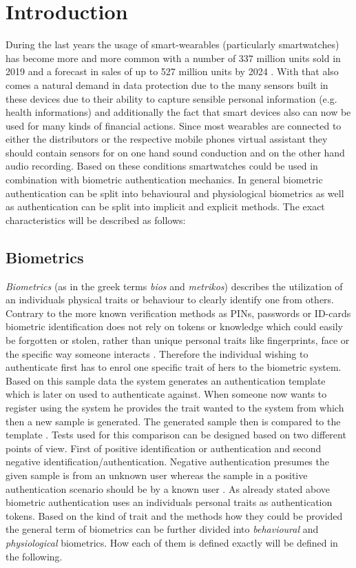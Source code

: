 \section{Introduction}
During the last years the usage of smart-wearables (particularly smartwatches) has become more and more common with a number of 337 million units sold in 2019 and a forecast in sales of up to 527 million units by 2024 \cite{tenzer}.
With that also comes a natural demand in data protection due to the many sensors built in these devices due to their ability to capture sensible personal information (e.g. health informations) and additionally the fact that smart devices also can now be used for many kinds of financial actions.\newline
Since most wearables are connected to either the distributors or the respective mobile phones virtual assistant they should contain sensors for on one hand sound conduction and on the other hand audio recording.\newline
Based on these conditions smartwatches could be used in combination with biometric authentication mechanics.\newline
In general biometric authentication can be split into behavioural and physiological biometrics as well as authentication can be split into implicit and explicit methods. The exact characteristics will be described as follows: 
\subsection{Biometrics}
\textit{Biometrics} (as in the greek terms \textit{bios} and \textit{metrikos}) describes the utilization of an individuals physical traits or behaviour to clearly identify one from others. Contrary to the more known verification methods as PINs, passwords or ID-cards biometric identification does not rely on tokens or knowledge which could easily be forgotten or stolen, rather than unique personal traits like fingerprints, face or the specific way someone interacts \cite[chpt. 1.1]{jain2007handbook}\cite{delac2004survey}. Therefore the individual wishing to authenticate first has to enrol one specific trait of hers to the biometric system. Based on this sample data the system generates an authentication template which is later on used to authenticate against.\newpage
When someone now wants to register using the system he provides the trait wanted to the system from which then a new sample is generated. The generated sample then is compared to the template \cite{alsaadi2015physiological}.\newline
Tests used for this comparison can be designed based on two different points of view. First of positive identification or authentication and second negative identification/authentication. Negative authentication presumes the given sample is from an unknown user whereas the sample in a positive authentication scenario should be by a known user \cite{wayman2005introduction}.
As already stated above biometric authentication uses an individuals personal traits as authentication tokens. Based on the kind of trait and the methods how they could be provided the general term of biometrics can be further divided into \textit{behavioural} and \textit{physiological} biometrics. How each of them is defined exactly will be defined in the following.
